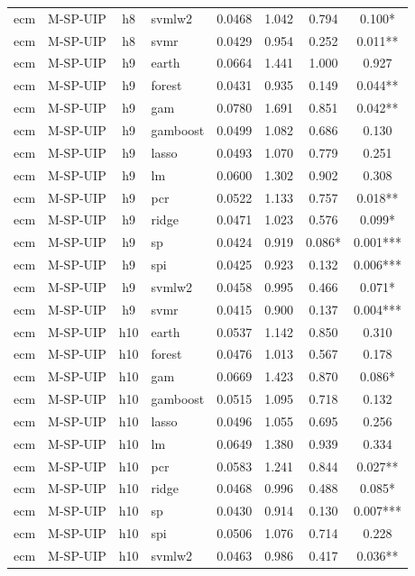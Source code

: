 \begin{ThreePartTable}
\begin{longtable}[t]{llclcccc}
ecm & M-SP-UIP & h8 & svmlw2 & 0.0468 & 1.042 & 0.794 & 0.100*\\
ecm & M-SP-UIP & h8 & svmr & 0.0429 & 0.954 & 0.252 & 0.011**\\
\addlinespace
ecm & M-SP-UIP & h9 & earth & 0.0664 & 1.441 & 1.000 & 0.927\\
ecm & M-SP-UIP & h9 & forest & 0.0431 & 0.935 & 0.149 & 0.044**\\
ecm & M-SP-UIP & h9 & gam & 0.0780 & 1.691 & 0.851 & 0.042**\\
ecm & M-SP-UIP & h9 & gamboost & 0.0499 & 1.082 & 0.686 & 0.130\\
ecm & M-SP-UIP & h9 & lasso & 0.0493 & 1.070 & 0.779 & 0.251\\
ecm & M-SP-UIP & h9 & lm & 0.0600 & 1.302 & 0.902 & 0.308\\
ecm & M-SP-UIP & h9 & pcr & 0.0522 & 1.133 & 0.757 & 0.018**\\
ecm & M-SP-UIP & h9 & ridge & 0.0471 & 1.023 & 0.576 & 0.099*\\
ecm & M-SP-UIP & h9 & sp & 0.0424 & 0.919 & 0.086* & 0.001***\\
ecm & M-SP-UIP & h9 & spi & 0.0425 & 0.923 & 0.132 & 0.006***\\
ecm & M-SP-UIP & h9 & svmlw2 & 0.0458 & 0.995 & 0.466 & 0.071*\\
ecm & M-SP-UIP & h9 & svmr & 0.0415 & 0.900 & 0.137 & 0.004***\\
\addlinespace
ecm & M-SP-UIP & h10 & earth & 0.0537 & 1.142 & 0.850 & 0.310\\
ecm & M-SP-UIP & h10 & forest & 0.0476 & 1.013 & 0.567 & 0.178\\
ecm & M-SP-UIP & h10 & gam & 0.0669 & 1.423 & 0.870 & 0.086*\\
ecm & M-SP-UIP & h10 & gamboost & 0.0515 & 1.095 & 0.718 & 0.132\\
ecm & M-SP-UIP & h10 & lasso & 0.0496 & 1.055 & 0.695 & 0.256\\
ecm & M-SP-UIP & h10 & lm & 0.0649 & 1.380 & 0.939 & 0.334\\
ecm & M-SP-UIP & h10 & pcr & 0.0583 & 1.241 & 0.844 & 0.027**\\
ecm & M-SP-UIP & h10 & ridge & 0.0468 & 0.996 & 0.488 & 0.085*\\
ecm & M-SP-UIP & h10 & sp & 0.0430 & 0.914 & 0.130 & 0.007***\\
ecm & M-SP-UIP & h10 & spi & 0.0506 & 1.076 & 0.714 & 0.228\\
ecm & M-SP-UIP & h10 & svmlw2 & 0.0463 & 0.986 & 0.417 & 0.036**\\

\end{longtable}
\end{ThreePartTable}
